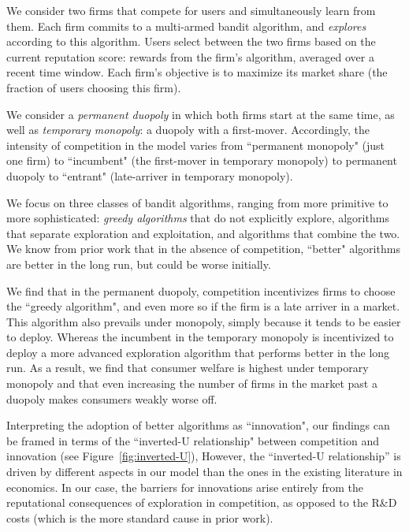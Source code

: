\documentclass[../competing_bandits_with_appendix.tex]{subfiles}
\begin{document}
 We consider two firms that compete for users and simultaneously learn from them. Each firm commits to a multi-armed bandit algorithm, and \emph{explores} according to this algorithm. Users select between the two firms based on the current reputation score: rewards from the firm's algorithm, averaged over a recent time window. Each firm's objective is to maximize its market share (the fraction of users choosing this firm).



We consider a \emph{permanent duopoly} in which both firms start at the same time, as well as \emph{temporary monopoly}: a duopoly with a first-mover. Accordingly, the intensity of competition in the model varies from ``permanent monopoly" (just one firm) to ``incumbent" (the first-mover in temporary monopoly) to permanent duopoly to ``entrant" (late-arriver in temporary monopoly).

We focus on three classes of bandit algorithms, ranging from more primitive to more sophisticated: \emph{greedy algorithms} that do not explicitly explore, algorithms that separate exploration and exploitation, and algorithms that combine the two. We know from prior work that in the absence of competition,  ``better" algorithms are better in the long run, but could be worse initially.


We find that in the permanent duopoly, competition incentivizes firms to choose the ``greedy algorithm", and even more so if the firm is a late arriver in a market. This algorithm also prevails under monopoly, simply because it tends to be easier to deploy. Whereas the incumbent in the temporary monopoly is incentivized to deploy a more advanced exploration algorithm that performs better in the long run. As a result, we find that consumer welfare is highest under temporary monopoly and that even increasing the number of firms in the market past a duopoly makes consumers weakly worse off.

Interpreting the adoption of better algorithms as ``innovation", our
findings can be framed in terms of the ``inverted-U relationship"
between competition and innovation (see Figure~\ref{fig:inverted-U}),
  However, the
``inverted-U relationship'' is driven by different aspects in our
model than the ones in the existing literature in economics. In our
case, the barriers for innovations arise entirely from the
reputational consequences of exploration in competition, as opposed to
the R\&D costs (which is the more standard cause in prior work).
\end{document}
